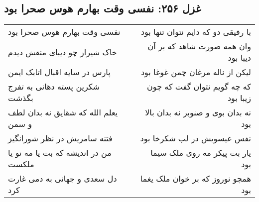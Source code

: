 \begin{center}
\section*{غزل ۲۵۶: نفسی وقت بهارم هوس صحرا بود}
\label{sec:256}
\begin{longtable}{l p{0.5cm} r}
نفسی وقت بهارم هوس صحرا بود
&&
با رفیقی دو که دایم نتوان تنها بود
\\
خاک شیراز چو دیبای منقش دیدم
&&
وان همه صورت شاهد که بر آن دیبا بود
\\
پارس در سایه اقبال اتابک ایمن
&&
لیکن از ناله مرغان چمن غوغا بود
\\
شکرین پسته دهانی به تفرج بگذشت
&&
که چه گویم نتوان گفت که چون زیبا بود
\\
یعلم الله که شقایق نه بدان لطف و سمن
&&
نه بدان بوی و صنوبر نه بدان بالا بود
\\
فتنه سامریش در نظر شورانگیز
&&
نفس عیسویش در لب شکرخا بود
\\
من در اندیشه که بت یا مه نو یا ملکست
&&
یار بت پیکر مه روی ملک سیما بود
\\
دل سعدی و جهانی به دمی غارت کرد
&&
همچو نوروز که بر خوان ملک یغما بود
\\
\end{longtable}
\end{center}
